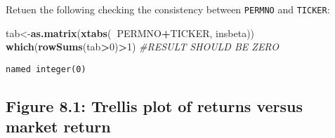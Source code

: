 \documentclass[]{book}
\newenvironment{Shaded}{\begin{snugshade}}{\end{snugshade}}
\newcommand{\CommentTok}[1]{\textcolor[rgb]{0.56,0.35,0.01}{\textit{#1}}}
\newcommand{\ControlFlowTok}[1]{\textcolor[rgb]{0.13,0.29,0.53}{\textbf{#1}}}
\newcommand{\DataTypeTok}[1]{\textcolor[rgb]{0.13,0.29,0.53}{#1}}
\newcommand{\DecValTok}[1]{\textcolor[rgb]{0.00,0.00,0.81}{#1}}
\newcommand{\FloatTok}[1]{\textcolor[rgb]{0.00,0.00,0.81}{#1}}
\newcommand{\KeywordTok}[1]{\textcolor[rgb]{0.13,0.29,0.53}{\textbf{#1}}}
\newcommand{\NormalTok}[1]{#1}
\newcommand{\OperatorTok}[1]{\textcolor[rgb]{0.81,0.36,0.00}{\textbf{#1}}}
\newcommand{\OtherTok}[1]{\textcolor[rgb]{0.56,0.35,0.01}{#1}}
\newcommand{\StringTok}[1]{\textcolor[rgb]{0.31,0.60,0.02}{#1}}
\begin{document}
Retuen the following checking the consistency between \texttt{PERMNO} and \texttt{TICKER}:

\begin{Shaded}
\begin{Highlighting}[]
\NormalTok{tab<-}\KeywordTok{as.matrix}\NormalTok{(}\KeywordTok{xtabs}\NormalTok{(}\OperatorTok{~}\NormalTok{PERMNO}\OperatorTok{+}\NormalTok{TICKER, insbeta)) }
\KeywordTok{which}\NormalTok{(}\KeywordTok{rowSums}\NormalTok{(tab}\OperatorTok{>}\DecValTok{0}\NormalTok{)}\OperatorTok{>}\DecValTok{1}\NormalTok{) }\CommentTok{#RESULT SHOULD BE ZERO}
\end{Highlighting}
\end{Shaded}

\begin{verbatim}
named integer(0)
\end{verbatim}

\hypertarget{figure-8.1-trellis-plot-of-returns-versus-market-return}{%
\subsection{Figure 8.1: Trellis plot of returns versus market return}\label{figure-8.1-trellis-plot-of-returns-versus-market-return}}

\begin{Shaded}
\end{Shaded}
\end{document}
